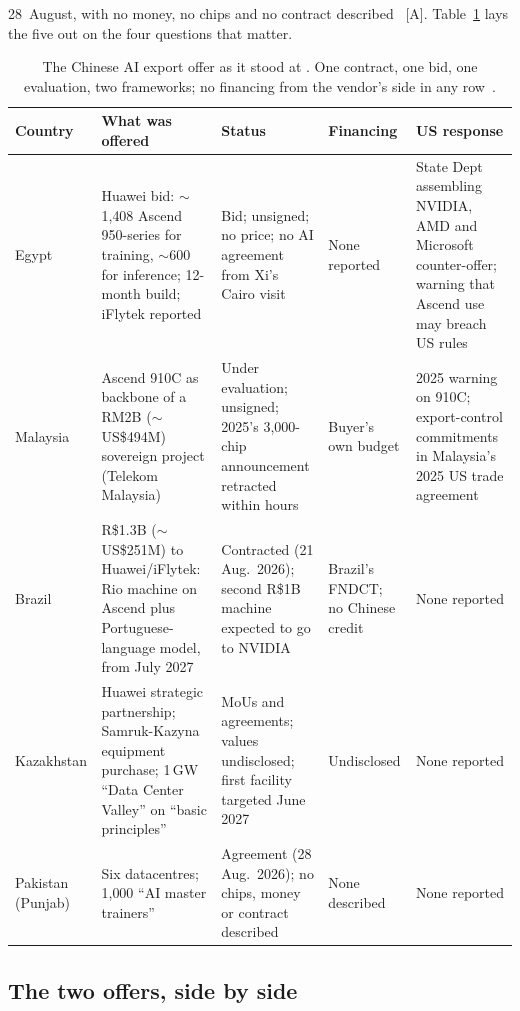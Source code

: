 28~August, with no money, no chips and no contract described~\cite{kazakh-huawei} [A]. Table~\ref{tab:export-offer} lays the five out on the four questions that matter.

\begin{table}[htbp]
  \centering\footnotesize
  \caption{The Chinese AI export offer as it stood at \datafreeze. One contract, one bid, one evaluation, two frameworks; no financing from the vendor's side in any row~\cite{huawei-egypt,huawei-malaysia,brazil-ai-supercomputer,kazakh-huawei}.}
  \label{tab:export-offer}
  \setlength{\tabcolsep}{4pt}
  \begin{tabular}{p{17mm}p{40mm}p{22mm}p{25mm}p{30mm}}
    \toprule
    Country & What was offered & Status & Financing & US response \\
    \midrule
    Egypt & Huawei bid: $\sim$1{,}408 Ascend 950-series for training, $\sim$600 for inference; 12-month build; iFlytek reported & Bid; unsigned; no price; no AI agreement from Xi's Cairo visit & None reported & State Dept assembling NVIDIA, AMD and Microsoft counter-offer; warning that Ascend use may breach US rules \\
    \addlinespace
    Malaysia & Ascend 910C as backbone of a RM2B ($\sim$US\$494M) sovereign project (Telekom Malaysia) & Under evaluation; unsigned; 2025's 3{,}000-chip announcement retracted within hours & Buyer's own budget & 2025 warning on 910C; export-control commitments in Malaysia's 2025 US trade agreement \\
    \addlinespace
    Brazil & R\$1.3B ($\sim$US\$251M) to Huawei/iFlytek: Rio machine on Ascend plus Portuguese-language model, from July 2027 & Contracted (21 Aug.\ 2026); second R\$1B machine expected to go to NVIDIA & Brazil's FNDCT; no Chinese credit & None reported \\
    \addlinespace
    Kazakhstan & Huawei strategic partnership; Samruk-Kazyna equipment purchase; 1\,GW ``Data Center Valley'' on ``basic principles'' & MoUs and agreements; values undisclosed; first facility targeted June 2027 & Undisclosed & None reported \\
    \addlinespace
    Pakistan (Punjab) & Six datacentres; 1{,}000 ``AI master trainers'' & Agreement (28 Aug.\ 2026); no chips, money or contract described & None described & None reported \\
    \bottomrule
  \end{tabular}
\end{table}

\subsection{The two offers, side by side}

